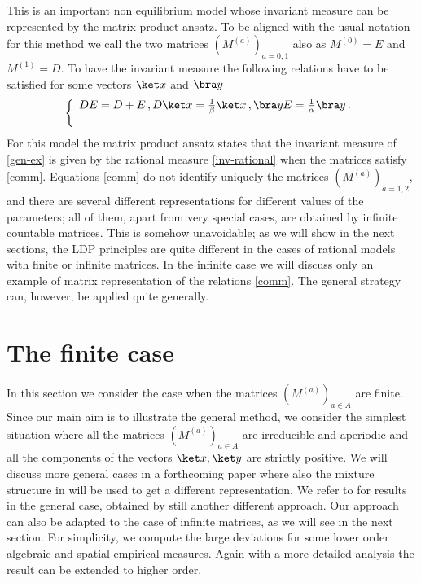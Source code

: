 \documentclass[reqno]{amsart}
\theoremstyle{plain}
\theoremstyle{definition}
\theoremstyle{remark}
\numberwithin{equation}{section}
\numberwithin{theorem}{section}
\def\\{\par\medskip}
\newcommand{\<}{\langle}
\renewcommand{\>}{\rangle}
\begin{document}
	This is an important non equilibrium model whose invariant measure can be represented by the matrix product ansatz. To be aligned with the usual notation for this method we call the two matrices $(M^{(a)})_{a=0,1}$ also as  $M^{(0)}=E$ and $M^{(1)}=D$. To have the invariant measure the following relations have to be satisfied for some vectors $\ket x$ and $\bra y$
	\begin{equation}\label{comm}
		\left\{
		\begin{array}{l}
			DE=D+E \,,\\
			D \ket x=\frac 1\beta \ket x\,, \\
			\bra y E=\frac 1\alpha \bra y\,.
		\end{array}
		\right.
	\end{equation}
	For this model the matrix product ansatz states that the invariant measure of \eqref{gen-ex} is given by the rational measure \eqref{inv-rational} when the matrices satisfy \eqref{comm}. Equations \eqref{comm} do not identify uniquely the matrices $(M^{(a)})_{a=1,2}$, and there are several different representations for different values of the parameters; all of them, apart from very special cases, are obtained by infinite countable matrices. This is somehow unavoidable; as we will show in the next sections, the LDP principles are quite different in the cases of rational models with finite or infinite matrices. In the infinite case we will discuss only an example of matrix representation of the relations \eqref{comm}. The general strategy can, however, be applied quite generally.
	
	
	
	\section{The finite case}
	In this section we consider the case when the matrices $(M^{(a)})_{a\in A}$ are finite.
	Since our main aim is to illustrate the general method, we consider the simplest situation where all the matrices $(M^{(a)})_{a\in A}$ are irreducible and aperiodic and all the components of the vectors $\ket x,\ket y$ are strictly positive. We will discuss more general cases in a forthcoming paper \cite{GGIM} where also the mixture structure in \cite{GI1} will be used to get a different representation. We refer to  \cite{G2} for results in the general case, obtained by still another different approach. Our approach can also be adapted to the case of infinite matrices, as we will see in the next section. For simplicity, we compute the large deviations for some lower order algebraic and spatial empirical measures. Again with a more detailed analysis the result can be extended to higher order.
	
\end{document}
